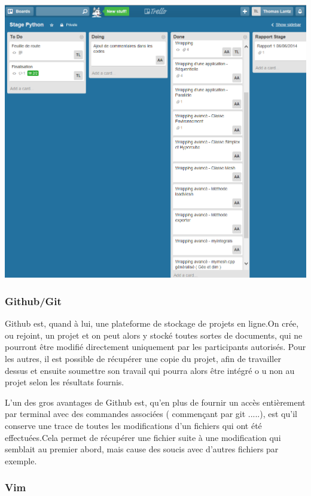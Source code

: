 \documentclass[french,12pt]{article}
\begin{document}
\includegraphics[scale=0.60]{1.png} 

\subsubsection{Github/Git}

Github est, quand à lui, une plateforme de stockage de projets en ligne.On crée, ou rejoint, un projet et on peut alors y stocké toutes sortes de documents, qui ne pourront être modifié directement uniquement par les participants autorisés.
Pour les autres, il est possible de récupérer une copie du projet, afin de travailler dessus et ensuite soumettre son travail qui pourra alors être intégré o u non au projet selon les résultats fournis.
\newline

L'un des gros avantages de Github est, qu'en plus de fournir un accès entièrement par terminal avec des commandes associées ( commençant par git .....), est qu'il conserve une trace de toutes les modifications d'un fichiers qui ont été effectuées.Cela permet de récupérer une fichier suite à une modification qui semblait au premier abord, mais cause des soucis avec d'autres fichiers par exemple.
   
\subsubsection{Vim}
\end{document}
